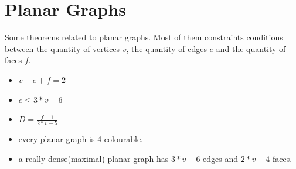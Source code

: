     
    \section{Planar Graphs}
    Some theorems related to planar graphs. Most of them constraints conditions between the quantity of vertices $v$, the quantity of edges $e$ and the quantity of faces $f$.
    \begin{itemize}
        \item $v - e + f = 2$
        \item $e \leq 3*v - 6$
        \item $D = \frac{f-1}{2*v-5}$
        \item every planar graph is 4-colourable.
        \item a really dense(maximal) planar graph has $3*v-6$ edges and $2*v-4$ faces.
    \end{itemize}
